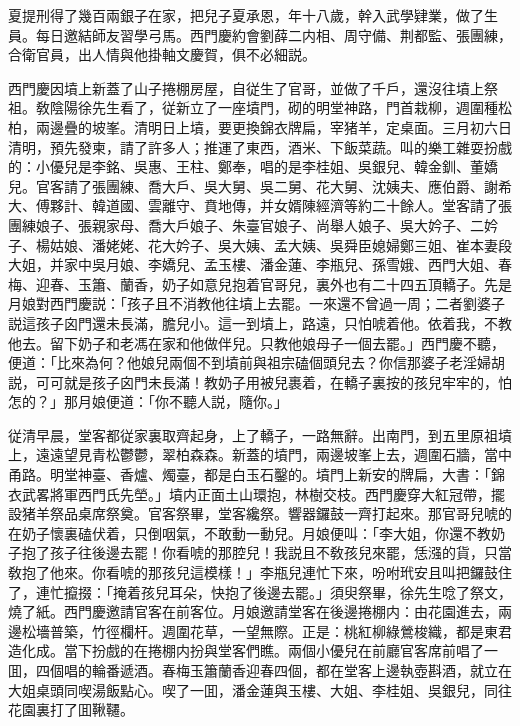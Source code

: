 夏提刑得了幾百兩銀子在家，把兒子夏承恩，年十八歲，幹入武學肄業，做了生員。每日邀結師友習學弓馬。西門慶約會劉薛二内相、周守備、荆都監、張團練，合衛官員，出人情與他掛軸文慶賀，俱不必細説。

西門慶因墳上新蓋了山子捲棚房屋，自従生了官哥，並做了千戶，還沒往墳上祭祖。敎陰陽徐先生看了，従新立了一座墳門，砌的明堂神路，門首栽柳，週圍種松柏，兩邊疊的坡峯。清明日上墳，要更換錦衣牌扁，宰猪羊，定桌面。三月初六日清明，預先發柬，請了許多人；推運了東西，酒米、下飯菜蔬。叫的樂工雜耍扮戲的：小優兒是李銘、吳惠、王柱、鄭奉，唱的是李桂姐、吳銀兒、韓金釧、董嬌兒。官客請了張團練、喬大戶、吳大舅、吳二舅、花大舅、沈姨夫、應伯爵、謝希大、傅夥計、韓道國、雲離守、賁地傳，并女婿陳經濟等約二十餘人。堂客請了張團練娘子、張親家母、喬大戶娘子、朱臺官娘子、尚舉人娘子、吳大妗子、二妗子、楊姑娘、潘姥姥、花大妗子、吳大姨、孟大姨、吳舜臣媳婦鄭三姐、崔本妻段大姐，并家中吳月娘、李嬌兒、孟玉樓、潘金蓮、李瓶兒、孫雪娥、西門大姐、春梅、迎春、玉簫、蘭香，奶子如意兒抱着官哥兒，裏外也有二十四五頂轎子。先是月娘對西門慶説：「孩子且不消教他往墳上去罷。一來還不曾過一周；二者劉婆子説這孩子囟門還未長滿，膽兒小。這一到墳上，路遠，只怕唬着他。依着我，不教他去。留下奶子和老馮在家和他做伴兒。只教他娘母子一個去罷。」西門慶不聽，便道：「比來為何？他娘兒兩個不到墳前與祖宗磕個頭兒去？你信那婆子老淫婦胡説，可可就是孩子囟門未長滿！教奶子用被兒裹着，在轎子裏按的孩兒牢牢的，怕怎的？」那月娘便道：「你不聽人説，隨你。」

従清早晨，堂客都従家裏取齊起身，上了轎子，一路無辭。出南門，到五里原祖墳上，遠遠望見青松鬱鬱，翠柏森森。新蓋的墳門，兩邊坡峯上去，週圍石牆，當中甬路。明堂神臺、香爐、燭臺，都是白玉石鑿的。墳門上新安的牌扁，大書：「錦衣武畧將軍西門氏先塋。」墳内正面土山環抱，林樹交枝。西門慶穿大紅冠帶，擺設猪羊祭品桌席祭奠。官客祭畢，堂客纔祭。響器鑼鼓一齊打起來。那官哥兒唬的在奶子懷裏磕伏着，只倒咽氣，不敢動一動兒。月娘便叫：「李大姐，你還不教奶子抱了孩子往後邊去罷！你看唬的那腔兒！我説且不敎孩兒來罷，恁漒的貨，只當敎抱了他來。你看唬的那孩兒這模樣！」李瓶兒連忙下來，吩咐玳安且叫把鑼鼓住了，連忙攛掇：「掩着孩兒耳朵，快抱了後邊去罷。」須臾祭畢，徐先生唸了祭文，燒了紙。西門慶邀請官客在前客位。月娘邀請堂客在後邊捲棚内：由花園進去，兩邊松墻普築，竹徑欄杆。週圍花草，一望無際。正是：桃紅柳綠鶯梭織，都是東君造化成。當下扮戲的在捲棚内扮與堂客們瞧。兩個小優兒在前廳官客席前唱了一囬，四個唱的輪番遞酒。春梅玉簫蘭香迎春四個，都在堂客上邊執壺斟酒，就立在大姐桌頭同喫湯飯點心。喫了一囬，潘金蓮與玉樓、大姐、李桂姐、吳銀兒，同往花園裏打了囬鞦韆。

